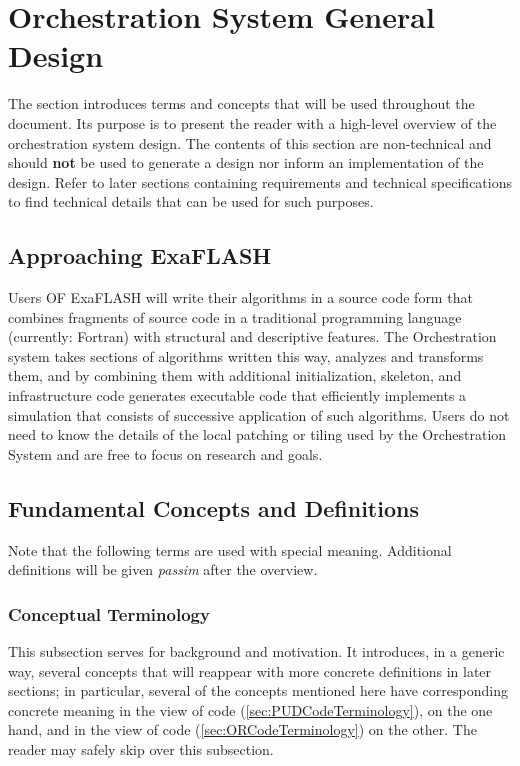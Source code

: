 \documentclass{article}
\begin{document}
\newpage
\section{Orchestration System General Design}
The section introduces terms and concepts that will be used throughout the
document.  Its purpose is to present the reader with a high-level overview of
the orchestration system design.  The contents of this section are non-technical
and should \textbf{not} be used to generate a design nor inform an
implementation of the design.  Refer to later sections containing requirements
and technical specifications to find technical details that can be used for such
purposes.\\

\subsection{Approaching ExaFLASH}

Users OF ExaFLASH will write their algorithms in a source code form
that combines fragments of source code in a traditional programming language (currently: Fortran)
with structural and descriptive features. The Orchestration system takes
sections of algorithms written this way, analyzes and transforms them,
and by combining them with additional initialization, skeleton, and infrastructure code
generates executable code that efficiently implements a simulation
that consists of successive application of such algorithms. Users do not need to know
the details of the local patching or tiling used by the Orchestration System and are free to focus on
research and goals. \\



\subsection{Fundamental Concepts and Definitions}
Note that the following terms are used with special meaning. Additional definitions will be given
\textit{passim} after the overview.


\subsubsection{Conceptual Terminology}
This subsection serves for background and motivation.
It introduces, in a generic way, several concepts that will
reappear with more concrete definitions in later sections;
in particular, several of the concepts mentioned here have
corresponding concrete meaning in the \PUD view of code (\ref{sec:PUDCodeTerminology}), on the one hand,
and in the \OR view of code (\ref{sec:ORCodeTerminology}) on the other.
The reader may safely skip over this subsection.
\end{document}
